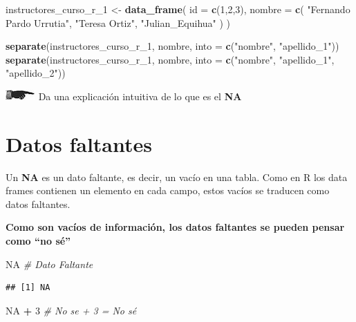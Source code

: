\documentclass[]{book}
\newenvironment{Shaded}{\begin{snugshade}}{\end{snugshade}}
\newcommand{\KeywordTok}[1]{\textcolor[rgb]{0.13,0.29,0.53}{\textbf{#1}}}
\newcommand{\DataTypeTok}[1]{\textcolor[rgb]{0.13,0.29,0.53}{#1}}
\newcommand{\DecValTok}[1]{\textcolor[rgb]{0.00,0.00,0.81}{#1}}
\newcommand{\StringTok}[1]{\textcolor[rgb]{0.31,0.60,0.02}{#1}}
\newcommand{\CommentTok}[1]{\textcolor[rgb]{0.56,0.35,0.01}{\textit{#1}}}
\newcommand{\OtherTok}[1]{\textcolor[rgb]{0.56,0.35,0.01}{#1}}
\newcommand{\OperatorTok}[1]{\textcolor[rgb]{0.81,0.36,0.00}{\textbf{#1}}}
\newcommand{\NormalTok}[1]{#1}
\theoremstyle{definition}
\theoremstyle{definition}
\theoremstyle{definition}
\theoremstyle{remark}
\begin{document}
\begin{Shaded}
\begin{Highlighting}[]
\NormalTok{instructores_curso_r_}\DecValTok{1}\NormalTok{ <-}\StringTok{ }\KeywordTok{data_frame}\NormalTok{(}
  \DataTypeTok{id =} \KeywordTok{c}\NormalTok{(}\DecValTok{1}\NormalTok{,}\DecValTok{2}\NormalTok{,}\DecValTok{3}\NormalTok{),}
  \DataTypeTok{nombre =} \KeywordTok{c}\NormalTok{(}
    \StringTok{"Fernando Pardo Urrutia"}\NormalTok{,}
    \StringTok{"Teresa Ortiz"}\NormalTok{,}
    \StringTok{"Julian_Equihua"}
\NormalTok{  )}
\NormalTok{)}

\KeywordTok{separate}\NormalTok{(instructores_curso_r_}\DecValTok{1}\NormalTok{, nombre, }\DataTypeTok{into =} \KeywordTok{c}\NormalTok{(}\StringTok{"nombre"}\NormalTok{, }\StringTok{"apellido_1"}\NormalTok{))}
\KeywordTok{separate}\NormalTok{(instructores_curso_r_}\DecValTok{1}\NormalTok{, nombre, }\DataTypeTok{into =} \KeywordTok{c}\NormalTok{(}\StringTok{"nombre"}\NormalTok{, }\StringTok{"apellido_1"}\NormalTok{, }\StringTok{"apellido_2"}\NormalTok{))}
\end{Highlighting}
\end{Shaded}

\includegraphics{./imagenes/manicule2.jpg} Da una explicación intuitiva
de lo que es el \textbf{NA}

\section{Datos faltantes}\label{datos-faltantes}

Un \textbf{NA} es un dato faltante, es decir, un vacío en una tabla.
Como en R los data frames contienen un elemento en cada campo, estos
vacíos se traducen como datos faltantes.

\textbf{Como son vacíos de información, los datos faltantes se pueden
pensar como ``no sé''}

\begin{Shaded}
\begin{Highlighting}[]
\OtherTok{NA} \CommentTok{# Dato Faltante}
\end{Highlighting}
\end{Shaded}

\begin{verbatim}
## [1] NA
\end{verbatim}

\begin{Shaded}
\begin{Highlighting}[]
\OtherTok{NA} \OperatorTok{+}\StringTok{ }\DecValTok{3} \CommentTok{# No se + 3 = No sé}
\end{Highlighting}
\end{Shaded}
\end{document}
